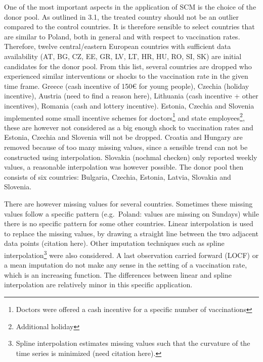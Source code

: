 \documentclass{scrbook}
\begin{document}
One of the most important aspects in the application of SCM is the
choice of the donor pool. As outlined in 3.1, the treated country should
not be an outlier compared to the control countries. It is therefore
sensible to select countries that are similar to Poland, both in general
and with respect to vaccination rates. Therefore, twelve central/eastern
European countries with sufficient data availability (AT, BG, CZ, EE,
GR, LV, LT, HR, HU, RO, SI, SK) are initial candidates for the donor
pool. From this list, several countries are dropped who experienced
similar interventions or shocks to the vaccination rate in the given
time frame. Greece (cash incentive of 150€ for young people), Czechia
(holiday incentive), Austria (need to find a reason here), Lithuania
(cash incentive + other incentives), Romania (cash and lottery
incentive). Estonia, Czechia and Slovenia implemented some small
incentive schemes for
doctors\footnote{Doctors were offered a cash incentive for a specific number of vaccinations}
and state employees\footnote{Additional holiday}, these are however not
considered as a big enough shock to vaccination rates and Estonia,
Czechia and Slovenia will not be dropped. Croatia and Hungary are
removed because of too many missing values, since a sensible trend can
not be constructed using interpolation. Slovakia (nochmal checken) only
reported weekly values, a reasonable interpolation was however possible.
The donor pool then consists of six countries: Bulgaria, Czechia,
Estonia, Latvia, Slovakia and Slovenia.

There are however missing values for several countries. Sometimes these
missing values follow a specific pattern (e.g.~Poland: values are
missing on Sundays) while there is no specific pattern for some other
countries. Linear interpolation is used to replace the missing values,
by drawing a straight line between the two adjacent data points
(citation here). Other imputation techniques such as spline
interpolation\footnote{Spline interpolation estimates missing values such that the curvature of the time series is minimized (need citation here).}
were also considered. A last observation carried forward (LOCF) or a
mean imputation do not make any sense in the setting of a vaccination
rate, which is an increasing function. The differences between linear
and spline interpolation are relatively minor in this specific
application.
\end{document}
